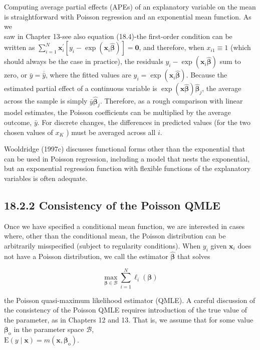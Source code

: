 \documentclass[10pt]{article}
\begin{document}
Computing average partial effects (APEs) of an explanatory variable on the mean is straightforward with Poisson regression and an exponential mean function. As we\\
saw in Chapter 13-see also equation (18.4)-the first-order condition can be written as $\sum_{i=1}^{N} \mathbf{x}_{i}^{\prime}\left[y_{i}-\exp \left(\mathbf{x}_{i} \hat{\boldsymbol{\beta}}\right)\right]=\mathbf{0}$, and therefore, when $x_{i 1} \equiv 1$ (which should always be the case in practice), the residuals $y_{i}-\exp \left(\mathbf{x}_{i} \hat{\boldsymbol{\beta}}\right)$ sum to zero, or $\bar{y}=\overline{\hat{y}}$, where the fitted values are $\hat{y}_{i}=\exp \left(\mathbf{x}_{i} \hat{\boldsymbol{\beta}}\right)$. Because the estimated partial effect of a continuous variable is $\exp (\mathbf{x} \hat{\boldsymbol{\beta}}) \hat{\boldsymbol{\beta}}_{j}$, the average across the sample is simply $\bar{y} \hat{\boldsymbol{\beta}}_{j}$. Therefore, as a rough comparison with linear model estimates, the Poisson coefficients can be multiplied by the average outcome, $\bar{y}$. For discrete changes, the differences in predicted values (for the two chosen values of $x_{K}$ ) must be averaged across all $i$.

Wooldridge (1997c) discusses functional forms other than the exponential that can be used in Poisson regression, including a model that nests the exponential, but an exponential regression function with flexible functions of the explanatory variables is often adequate.

\subsection*{18.2.2 Consistency of the Poisson QMLE}
Once we have specified a conditional mean function, we are interested in cases where, other than the conditional mean, the Poisson distribution can be arbitrarily misspecified (subject to regularity conditions). When $y_{i}$ given $\mathbf{x}_{i}$ does not have a Poisson distribution, we call the estimator $\hat{\boldsymbol{\beta}}$ that solves


\begin{equation*}
\max _{\boldsymbol{\beta} \in \mathscr{B}} \sum_{i=1}^{N} \ell_{i}(\boldsymbol{\beta}) \tag{18.6}
\end{equation*}


the Poisson quasi-maximum likelihood estimator (QMLE). A careful discussion of the consistency of the Poisson QMLE requires introduction of the true value of the parameter, as in Chapters 12 and 13. That is, we assume that for some value $\boldsymbol{\beta}_{\mathrm{o}}$ in the parameter space $\mathscr{B}$,\\
$\mathrm{E}(y \mid \mathbf{x})=m\left(\mathbf{x}, \boldsymbol{\beta}_{\mathrm{o}}\right)$.
\end{document}
